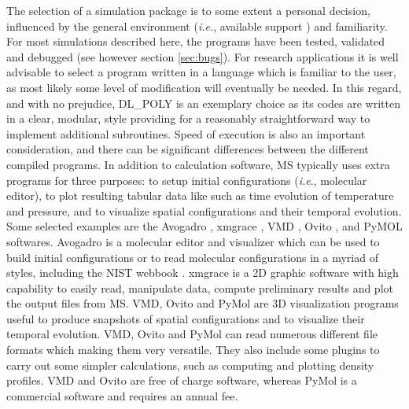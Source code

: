 \documentclass[9pt,tutorial]{livecoms}
\begin{document}
The selection of a simulation package is to some extent a personal decision,
influenced by the general environment (\textit{i.e.}, available support ) and
familiarity. For most simulations described here, the programs have been
tested, validated and debugged (see however section \ref{sec:bugs}). For research
applications it is well advisable to select a program written in a language
which is familiar to the user, as most likely some level of modification will eventually
be needed. In this regard, and with no prejudice, DL\_POLY is an exemplary
choice as its codes are written in a clear, modular, style providing for
a reasonably straightforward way to implement additional subroutines. Speed of
execution is also an important consideration, and there can be significant
differences between the different compiled programs. In addition to calculation
software, MS typically uses extra programs for three purposes: to setup initial configurations
(\textit{i.e}., molecular editor), to plot resulting tabular data like such as 
time evolution of temperature and pressure, and to visualize 
spatial configurations and their temporal evolution. Some selected examples are
the Avogadro \citep{avogadro}, xmgrace \citep{xmgrace},
VMD \citep{VMD}, Ovito \citep{ovito}, and PyMOL \citep{pymol} softwares.
Avogadro is a molecular editor and visualizer which can
be used to build initial configurations or to read molecular configurations in
a myriad of styles, including the NIST webbook \citep{lemmon2013}. xmgrace is a 2D graphic software with high capability to
easily read, manipulate data, compute preliminary results and plot the output
files from MS. VMD, Ovito and PyMol are 3D visualization programs useful to
produce snapshots of spatial configurations and to visualize their temporal
evolution. VMD, Ovito and PyMol can read numerous different file formats which
making them very versatile. They also include some plugins to
carry out some simpler calculations, such as computing and plotting density profiles. VMD and Ovito
are free of charge software, whereas PyMol is a commercial software and
requires an annual fee.
\end{document}
